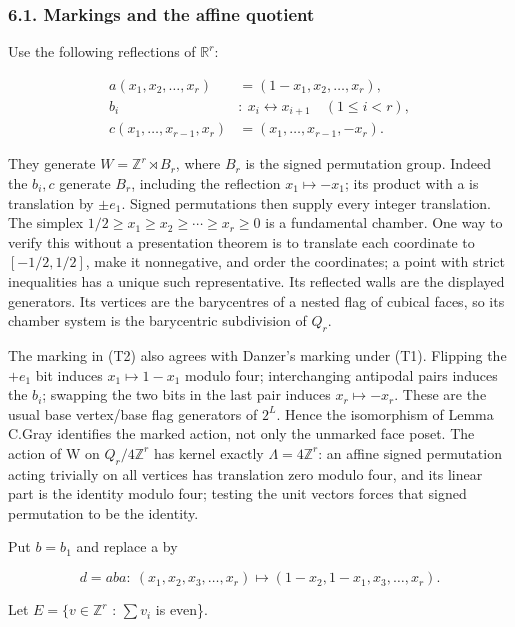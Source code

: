 \documentclass[
  11pt,
  a4paper,
]{article}
\begin{document}
\subsubsection{6.1. Markings and the affine
quotient}\label{markings-and-the-affine-quotient}

Use the following reflections of \(\mathbb R^r\):

\[
\begin{aligned}
a(x_1,x_2,\ldots,x_r)&=(1-x_1,x_2,\ldots,x_r),\\
b_i&:\ x_i\leftrightarrow x_{i+1}\quad(1\le i<r),\\
c(x_1,\ldots,x_{r-1},x_r)&=(x_1,\ldots,x_{r-1},-x_r).
\end{aligned}
\tag{T2}
\]

They generate \(W=\mathbb Z^r\rtimes B_r\), where \(B_r\) is the signed
permutation group. Indeed the \(b_i,c\) generate \(B_r\), including the
reflection \(x_1\mapsto -x_1\); its product with a is translation by
\(±e_1\). Signed permutations then supply every integer translation. The
simplex \(1/2\ge x_1\ge x_2\ge \cdots \ge x_r\ge 0\) is a fundamental
chamber. One way to verify this without a presentation theorem is to
translate each coordinate to \([-1/2,1/2]\), make it nonnegative, and
order the coordinates; a point with strict inequalities has a unique
such representative. Its reflected walls are the displayed generators.
Its vertices are the barycentres of a nested flag of cubical faces, so
its chamber system is the barycentric subdivision of \(Q_r\).

The marking in (T2) also agrees with Danzer's marking under (T1).
Flipping the \(+e_1\) bit induces \(x_1\mapsto 1-x_1\) modulo four;
interchanging antipodal pairs induces the \(b_i\); swapping the two bits
in the last pair induces \(x_r\mapsto -x_r\). These are the usual base
vertex/base flag generators of \(2^L\). Hence the isomorphism of Lemma
C.Gray identifies the marked action, not only the unmarked face poset.
The action of W on \(Q_r/4\mathbb Z^r\) has kernel exactly
\(\Lambda =4\mathbb Z^r\): an affine signed permutation acting trivially
on all vertices has translation zero modulo four, and its linear part is
the identity modulo four; testing the unit vectors forces that signed
permutation to be the identity.

Put \(b=b_1\) and replace a by

\[
d=aba:\ (x_1,x_2,x_3,\ldots,x_r)\mapsto(1-x_2,1-x_1,x_3,\ldots,x_r).
\tag{T3}
\]

Let \(E=\{v\in \mathbb Z^r\) : \(\sum v_i\) is even\}.
\end{document}
